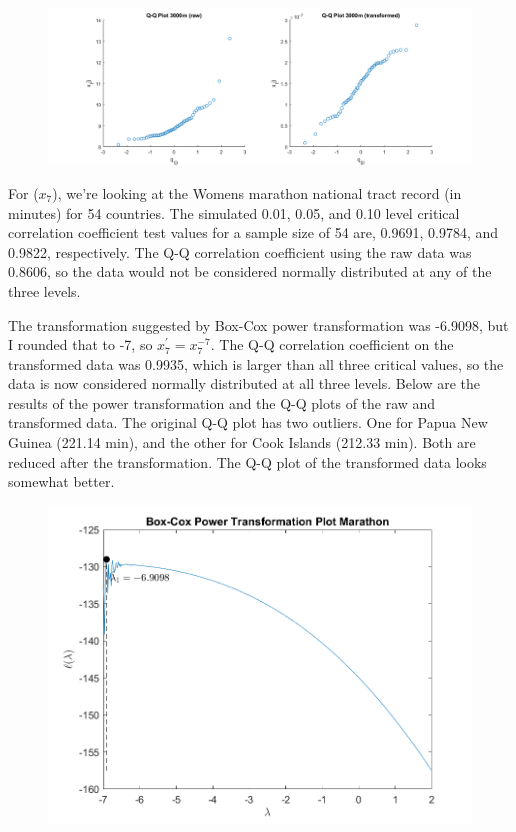 \begin{center}
    \begin{figure}[H]
        \centering
        \includegraphics[scale=0.4]{./matlab/chapter-4/sol4.36.qq.6.png}
    \end{figure}
\end{center}

For ($x_{7}$), we're looking at the Womens marathon national tract record (in minutes) for 54 countries. The simulated 0.01, 0.05, and 0.10 level critical correlation coefficient test values for a sample size of 54 are, 0.9691, 0.9784, and 0.9822, respectively. The Q-Q correlation coefficient using the raw data was 0.8606, so the data would not be considered normally distributed at any of the three levels.

The transformation suggested by Box-Cox power transformation was -6.9098, but I rounded that to -7, so $x_{7}^{\prime} = x_{7}^{-7}$.
The Q-Q correlation coefficient on the transformed data was 0.9935, which is larger than all three critical values, so the data is now considered normally distributed at all three levels.
Below are the results of the power transformation and the Q-Q plots of the raw and transformed data.
The original Q-Q plot has two outliers. One for Papua New Guinea (221.14 min), and the other for Cook Islands (212.33 min). Both are reduced after the transformation. The Q-Q plot of the transformed data looks somewhat better.

\begin{center}
    \begin{figure}[H]
        \centering
        \includegraphics[scale=0.6]{./matlab/chapter-4/sol4.36.power.7.png}
    \end{figure}
\end{center}

